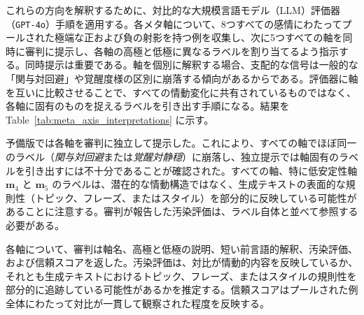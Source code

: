 これらの方向を解釈するために、対比的な大規模言語モデル（LLM）評価器（\texttt{GPT-4o}）手順を適用する。各メタ軸について、8つすべての感情にわたってプールされた極端な正および負の射影を持つ例を収集し、次に5つすべての軸を同時に審判に提示し、各軸の高極と低極に異なるラベルを割り当てるよう指示する。同時提示は重要である。軸を個別に解釈する場合、支配的な信号は一般的な「関与対回避」や覚醒度様の区別に崩落する傾向があるからである。評価器に軸を互いに比較させることで、すべての情動変化に共有されているものではなく、各軸に固有のものを捉えるラベルを引き出す手順になる。結果を Table~\ref{tab:meta_axis_interpretations} に示す。\par

予備版では各軸を審判に独立して提示した。これにより、すべての軸でほぼ同一のラベル（\textit{関与対回避}または\textit{覚醒対静穏}）に崩落し、独立提示では軸固有のラベルを引き出すには不十分であることが確認された。すべての軸、特に低安定性軸 $\mathbf{m}_4$ と $\mathbf{m}_5$ のラベルは、潜在的な情動構造ではなく、生成テキストの表面的な規則性（トピック、フレーズ、またはスタイル）を部分的に反映している可能性があることに注意する。審判が報告した汚染評価は、ラベル自体と並べて参照する必要がある。\par

各軸について、審判は軸名、高極と低極の説明、短い前言語的解釈、汚染評価、および信頼スコアを返した。汚染評価は、対比が情動的内容を反映しているか、それとも生成テキストにおけるトピック、フレーズ、またはスタイルの規則性を部分的に追跡している可能性があるかを推定する。信頼スコアはプールされた例全体にわたって対比が一貫して観察された程度を反映する。\par

